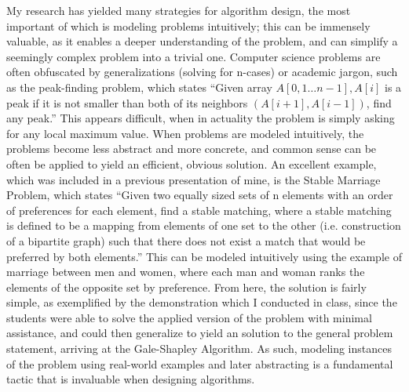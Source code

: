 \documentclass{article}
\begin{document}
My research has yielded many strategies for algorithm design, the most important of which is modeling problems intuitively; this can be immensely valuable, as it enables a deeper understanding of the problem, and can simplify a seemingly complex problem into a trivial one. Computer science problems are often obfuscated by generalizations (solving for n-cases) or academic jargon, such as the peak-finding problem, which states “Given array $A[0, 1…n-1], A[i]$ is a peak if it is not smaller than both of its neighbors $(A[i+1], A[i-1])$, find any peak.” This appears difficult, when in actuality the problem is simply asking for any local maximum value. When problems are modeled intuitively, the problems become less abstract and more concrete, and common sense can be often be applied to yield an efficient, obvious solution. An excellent example, which was included in a previous presentation of mine, is the Stable Marriage Problem, which states “Given two equally sized sets of n elements with an order of preferences for each element, find a stable matching, where a stable matching is defined to be a mapping from elements of one set to the other (i.e. construction of a bipartite graph) such that there does not exist a match that would be preferred by both elements.” This can be modeled intuitively using the example of marriage between men and women, where each man and woman ranks the elements of the opposite set by preference. From here, the solution is fairly simple, as exemplified by the demonstration which I conducted in class, since the students were able to solve the applied version of the problem with minimal assistance, and could then generalize to yield an solution to the general problem statement, arriving at the Gale-Shapley Algorithm. As such, modeling instances of the problem using real-world examples and later abstracting is a fundamental tactic that is invaluable when designing algorithms.
\end{document}
